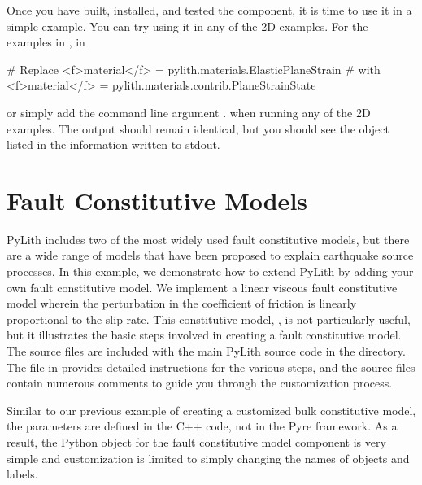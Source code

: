 Once you have built, installed, and tested the 
component, it is time to use it in a simple example. You can try using
it in any of the 2D examples. For the examples in ,
in 
\begin{cfg}
# Replace
<f>material</f> = pylith.materials.ElasticPlaneStrain
# with
<f>material</f> = pylith.materials.contrib.PlaneStrainState
\end{cfg}
or simply add the command line argument
.
when running any of the 2D examples. The output should remain
identical, but you should see the  object
listed in the information written to stdout.


\section{Fault Constitutive Models}
\label{sec:extending:fault}

PyLith includes two of the most widely used fault constitutive models,
but there are a wide range of models that have been proposed to explain
earthquake source processes. In this example, we demonstrate how to
extend PyLith by adding your own fault constitutive model. We implement
a linear viscous fault constitutive model wherein the perturbation
in the coefficient of friction is linearly proportional to the slip
rate. This constitutive model, , is not particularly
useful, but it illustrates the basic steps involved in creating a
fault constitutive model. The source files are included with the main
PyLith source code in the  directory. The
 file in  provides detailed
instructions for the various steps, and the source files contain numerous
comments to guide you through the customization process.

Similar to our previous example of creating a customized bulk constitutive
model, the parameters are defined in the C++ code, not in the Pyre
framework. As a result, the Python object for the fault constitutive
model component is very simple and customization is limited to simply
changing the names of objects and labels.


